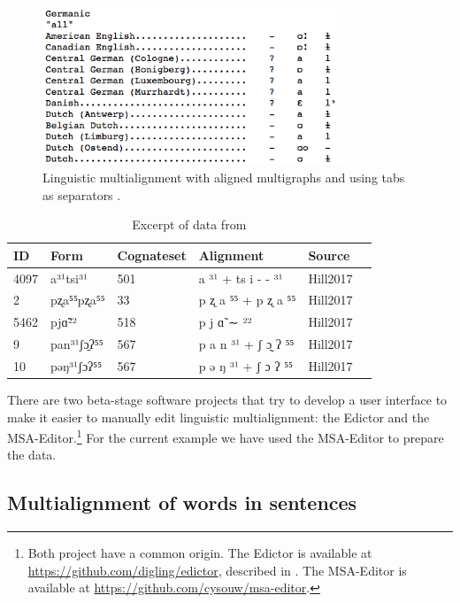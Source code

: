 \documentclass[11pt]{article}
\begin{document}
\begin{figure}[htbp]
  \centering
  \includegraphics[width=0.8\textwidth]{images/multialign_list.png}
  \caption{Linguistic multialignment with aligned multigraphs and using tabs as separators \parencite{list2014benchmark}.}
  \label{fig:multialign_list}
\end{figure}

\begin{table}[htp]
\centering
\begin{tabular}{llllll}                                              \hline
 ID   & Form        & Cognateset & Alignment           & Source   \\ \hline
 4097 & a³¹tsi³¹    & 501        & a ³¹ + ts i - - ³¹  & Hill2017 \\
 2    & pʐa⁵⁵pʐa⁵⁵  & 33         & p ʐ a ⁵⁵ + p ʐ a ⁵⁵ & Hill2017 \\ 
 5462 & pjɑ̃²²       & 518        & p j ɑ̃ ∼ ²²          & Hill2017 \\ 
 9    & pan³¹ʃɔ̱ʔ⁵⁵  & 567        & p a n ³¹ + ʃ ɔ̰ ʔ ⁵⁵ & Hill2017 \\ 
 10   & pəŋ³¹ʃɔʔ⁵⁵  & 567        & p ə ŋ ³¹ + ʃ ɔ ʔ ⁵⁵ & Hill2017 \\ \hline
\end{tabular}
\caption{Excerpt of data from \textcite{hill2017}}
\label{tab:data_hill}
\end{table}

There are two beta-stage software projects that try to develop a user interface to make it easier to manually edit linguistic multialignment: the Edictor and the MSA-Editor.\footnote{Both project have a common origin. The Edictor is available at \url{https://github.com/digling/edictor}, described in \textcite{list2017}. The MSA-Editor is available at \url{https://github.com/cysouw/msa-editor}.} For the current example we have used the MSA-Editor to prepare the data.

\subsection{Multialignment of words in sentences}
\end{document}
